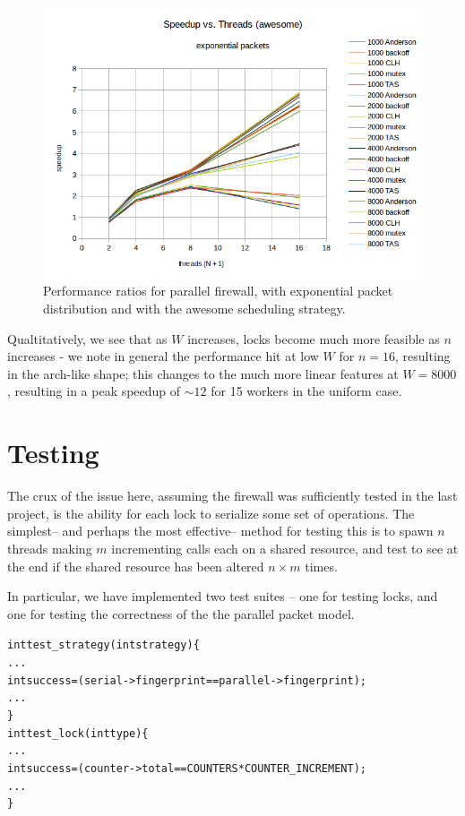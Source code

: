 \documentclass{article}
\begin{document}

\begin{figure}
\begin{center}
	\includegraphics[scale=.8]{packet_4.png}
	\caption{Performance ratios for parallel firewall, with exponential packet distribution and with the awesome scheduling strategy.}
	\label{packet_4}
\end{center}
\end{figure}

Qualtitatively, we see that as $W$ increases, locks become much more feasible as $n$ increases - we note in general the performance hit at low $W$ for $n = 16$, 
resulting in the arch-like shape; this changes to the much more linear features at $W = 8000$, resulting in a peak speedup of $\sim 12$ for 15 workers in the 
uniform case.

\section{Testing}

The crux of the issue here, assuming the firewall was sufficiently tested in the last project, is the ability for each lock to serialize some set of operations. The 
simplest-- and perhaps the most effective-- method for testing this is to spawn $n$ threads making $m$ incrementing calls each on a shared resource, and test to see 
at the end if the shared resource has been altered $n\times m$ times.

In particular, we have implemented two test suites -- one for testing locks, and one for testing the correctness of the the parallel packet model.

\begin{alltt}

int test_strategy(int strategy) \{
  ...
  int success = (serial->fingerprint == parallel->fingerprint);
  ...
\}
int test_lock(int type) \{
  ...
  int success = (counter->total == COUNTERS * COUNTER_INCREMENT);
  ...
\}

\end{alltt}
\end{document}
